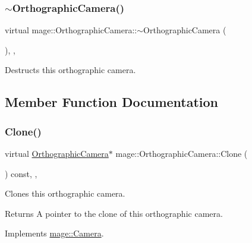 \subsubsection{\texorpdfstring{$\sim$\+Orthographic\+Camera()}{~OrthographicCamera()}}
{\footnotesize\ttfamily virtual mage\+::\+Orthographic\+Camera\+::$\sim$\+Orthographic\+Camera (\begin{DoxyParamCaption}{ }\end{DoxyParamCaption})\hspace{0.3cm}{\ttfamily [private]}, {\ttfamily [virtual]}, {\ttfamily [default]}}

Destructs this orthographic camera. 

\subsection{Member Function Documentation}
\hypertarget{classmage_1_1_orthographic_camera_ae075c08e4af88f74212bf5c84d2e5b2a}{}\label{classmage_1_1_orthographic_camera_ae075c08e4af88f74212bf5c84d2e5b2a} 
\subsubsection{\texorpdfstring{Clone()}{Clone()}}
{\footnotesize\ttfamily virtual \hyperlink{classmage_1_1_orthographic_camera}{Orthographic\+Camera}$\ast$ mage\+::\+Orthographic\+Camera\+::\+Clone (\begin{DoxyParamCaption}{ }\end{DoxyParamCaption}) const\hspace{0.3cm}{\ttfamily [override]}, {\ttfamily [private]}, {\ttfamily [virtual]}}

Clones this orthographic camera.

\begin{DoxyReturn}{Returns}
A pointer to the clone of this orthographic camera. 
\end{DoxyReturn}


Implements \hyperlink{classmage_1_1_camera_a19301c2256c183db50b5e9406f7b5f3c}{mage\+::\+Camera}.

\hypertarget{classmage_1_1_orthographic_camera_aedd86e56a0f7bc967ad8d9be2631a0cf}{}\label{classmage_1_1_orthographic_camera_aedd86e56a0f7bc967ad8d9be2631a0cf} 
